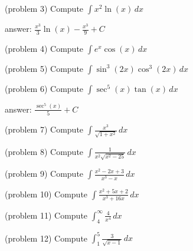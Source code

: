 \documentclass[handout]{ximera}
\begin{document}
\begin{problem}(problem 3)
Compute $\displaystyle \int x^2\ln(x) \, dx$

\begin{hint}
answer: $\displaystyle \frac{x^3}{3} \ln(x) - \frac{x^3}{9} + C$
\end{hint}


\end{problem}


\begin{problem}(problem 4)
Compute $\displaystyle \int e^x \cos(x) \, dx$

\end{problem}

\begin{problem}(problem 5)
Compute $\displaystyle \int \sin^3(2x) \cos^3(2x) \, dx$

\end{problem}

\begin{problem}(problem 6)
Compute $\displaystyle \int \sec^5(x) \tan(x)  \, dx$

\begin{hint}
answer: $\displaystyle \frac{\sec^5(x)}{5} + C$
\end{hint}

\end{problem}

\begin{problem}(problem 7)
Compute $\displaystyle \int \frac{x^3}{ \sqrt{1+x^2}} \, dx$

\end{problem}

\begin{problem}(problem 8)
Compute $\displaystyle \int \frac{1}{x^2 \sqrt{x^2 - 25}} \, dx$

\end{problem}

\begin{problem}(problem 9)
Compute $\displaystyle \int \frac{x^2 - 2x+3}{x^3-x} \, dx$

\end{problem}

\begin{problem}(problem 10)
Compute $\displaystyle \int \frac{x^2 + 5x + 2}{x^3 + 16x} \, dx$

\end{problem}

\begin{problem}(problem 11)
Compute $\displaystyle \int_4^\infty \frac{4}{x^4} \, dx$

\end{problem}

\begin{problem}(problem 12)
Compute $\displaystyle \int_1^5 \frac{3}{\sqrt{x-1}} \, dx$
\end{problem}
\end{document}
